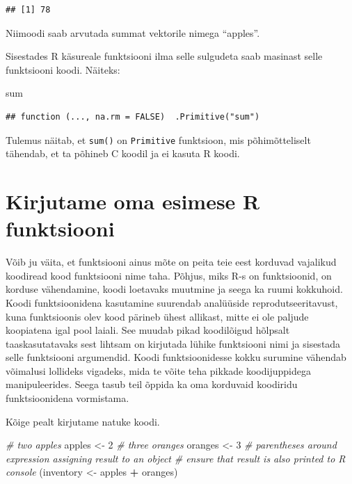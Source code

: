 \documentclass[]{book}
\newenvironment{Shaded}{\begin{snugshade}}{\end{snugshade}}
\newcommand{\DecValTok}[1]{\textcolor[rgb]{0.00,0.00,0.81}{#1}}
\newcommand{\StringTok}[1]{\textcolor[rgb]{0.31,0.60,0.02}{#1}}
\newcommand{\CommentTok}[1]{\textcolor[rgb]{0.56,0.35,0.01}{\textit{#1}}}
\newcommand{\OperatorTok}[1]{\textcolor[rgb]{0.81,0.36,0.00}{\textbf{#1}}}
\newcommand{\NormalTok}[1]{#1}
\begin{document}
\begin{verbatim}
## [1] 78
\end{verbatim}

Niimoodi saab arvutada summat vektorile nimega ``apples''.

Sisestades R käsureale funktsiooni ilma selle sulgudeta saab masinast
selle funktsiooni koodi. Näiteks:

\begin{Shaded}
\begin{Highlighting}[]
\NormalTok{sum}
\end{Highlighting}
\end{Shaded}

\begin{verbatim}
## function (..., na.rm = FALSE)  .Primitive("sum")
\end{verbatim}

Tulemus näitab, et \texttt{sum()} on \texttt{Primitive} funktsioon, mis
põhimõtteliselt tähendab, et ta põhineb C koodil ja ei kasuta R koodi.

\section{Kirjutame oma esimese R
funktsiooni}\label{kirjutame-oma-esimese-r-funktsiooni}

Võib ju väita, et funktsiooni ainus mõte on peita teie eest korduvad
vajalikud koodiread kood funktsiooni nime taha. Põhjus, miks R-s on
funktsioonid, on korduse vähendamine, koodi loetavaks muutmine ja seega
ka ruumi kokkuhoid. Koodi funktsioonidena kasutamine suurendab
analüüside reprodutseeritavust, kuna funktsioonis olev kood pärineb
ühest allikast, mitte ei ole paljude koopiatena igal pool laiali. See
muudab pikad koodilõigud hõlpsalt taaskasutatavaks sest lihtsam on
kirjutada lühike funktsiooni nimi ja sisestada selle funktsiooni
argumendid. Koodi funktsioonidesse kokku surumine vähendab võimalusi
lollideks vigadeks, mida te võite teha pikkade koodijuppidega
manipuleerides. Seega tasub teil õppida ka oma korduvaid koodiridu
funktsioonidena vormistama.

Kõige pealt kirjutame natuke koodi.

\begin{Shaded}
\begin{Highlighting}[]
\CommentTok{# two apples}
\NormalTok{apples <-}\StringTok{ }\DecValTok{2}
\CommentTok{# three oranges}
\NormalTok{oranges <-}\StringTok{ }\DecValTok{3} 
\CommentTok{# parentheses around expression assigning result to an object }
\CommentTok{# ensure that result is also printed to R console}
\NormalTok{(inventory <-}\StringTok{ }\NormalTok{apples }\OperatorTok{+}\StringTok{ }\NormalTok{oranges)}
\end{Highlighting}
\end{Shaded}
\end{document}
